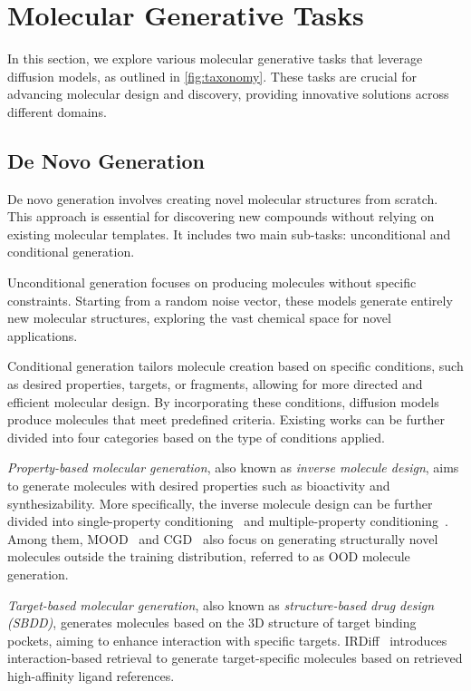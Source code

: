 \section{Molecular Generative Tasks}\label{sec:task}


In this section, we explore various molecular generative tasks that leverage diffusion models, as outlined in \cref{fig:taxonomy}. These tasks are crucial for advancing molecular design and discovery, providing innovative solutions across different domains.

\subsection{De Novo Generation}
De novo generation involves creating novel molecular structures from scratch. This approach is essential for discovering new compounds without relying on existing molecular templates. It includes two main sub-tasks: unconditional and conditional generation.


Unconditional generation focuses on producing molecules without specific constraints. Starting from a random noise vector, these models generate entirely new molecular structures, exploring the vast chemical space for novel applications.



Conditional generation tailors molecule creation based on specific conditions, such as desired properties, targets, or fragments, allowing for more directed and efficient molecular design. By incorporating these conditions, diffusion models produce molecules that meet predefined criteria. 
Existing works can be further divided into four categories based on the type of conditions applied.

\textit{Property-based molecular generation}, also known as \textit{inverse molecule design}, aims to generate molecules with desired properties such as bioactivity and synthesizability.
More specifically, the inverse molecule design can be further divided into single-property conditioning~\citep{CDGS,EDM,GeoLDM,MDM} and multiple-property conditioning~\citep{DiGress,GraphDiT,EEGSDE}.
Among them, MOOD~\citep{MOOD} and CGD~\citep{CGD} also focus on generating structurally novel molecules outside the training distribution, referred to as OOD molecule generation.

\textit{Target-based molecular generation}, also known as \textit{structure-based drug design (SBDD)}, generates molecules based on the 3D structure of target binding pockets, aiming to enhance interaction with specific targets.
IRDiff~\citep{IRDiff} introduces interaction-based retrieval to generate target-specific molecules based on retrieved high-affinity ligand references.

